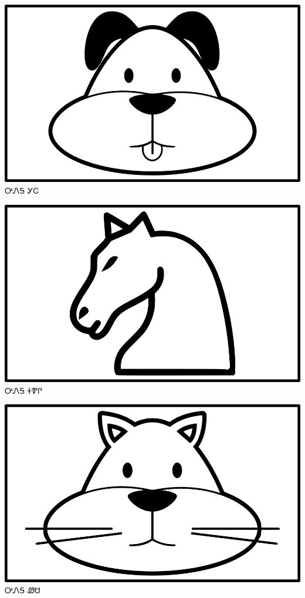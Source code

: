 \documentclass[avery5371]{flashcards}%
\begin{document}
\begin{flashcard}{
\includegraphics[width=0.95\columnwidth,height=.51\columnwidth,keepaspectratio]{../artwork/objects-animate/gihli}
}\Huge ᎤᏁᎦ ᎩᏟ
\end{flashcard}

\begin{flashcard}{
\includegraphics[width=0.95\columnwidth,height=.51\columnwidth,keepaspectratio]{../artwork/objects-animate/soquili}
}\Huge ᎤᏁᎦ ᏐᏈᎵ
\end{flashcard}

\begin{flashcard}{
\includegraphics[width=0.95\columnwidth,height=.51\columnwidth,keepaspectratio]{../artwork/objects-animate/wesa}
}\Huge ᎤᏁᎦ ᏪᏌ
\end{flashcard}
\end{document}

